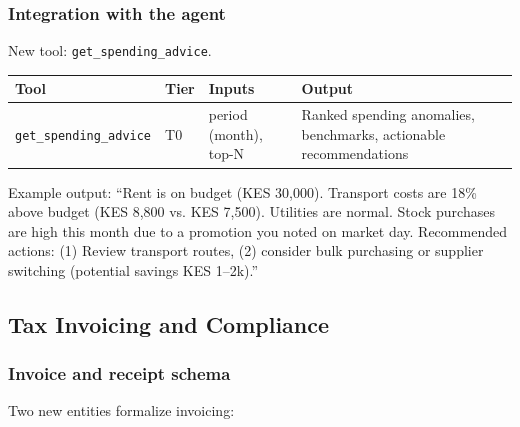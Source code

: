 \documentclass[10pt,a4paper]{article}
\newcommand{\code}[1]{\texttt{\small #1}}
\begin{document}
\subsubsection{Integration with the agent}

New tool: \code{get\_spending\_advice}.

\begin{center}
\begin{tabularx}{\textwidth}{@{}p{4.2cm}p{1.0cm}p{4.2cm}Y@{}}
\toprule
\textbf{Tool} & \textbf{Tier} & \textbf{Inputs} & \textbf{Output}\\
\midrule
\code{get\_spending\_advice} & T0 & period (month), top-N & Ranked spending anomalies, benchmarks, actionable recommendations\\
\bottomrule
\end{tabularx}
\end{center}

Example output: ``Rent is on budget (KES 30,000). Transport costs are 18\% above budget (KES 8,800 vs. KES 7,500). Utilities are normal. Stock purchases are high this month due to a promotion you noted on market day. Recommended actions: (1) Review transport routes, (2) consider bulk purchasing or supplier switching (potential savings KES 1--2k).''

\subsection{Tax Invoicing and Compliance}

\subsubsection{Invoice and receipt schema}

Two new entities formalize invoicing:
\end{document}
